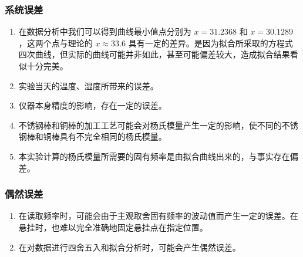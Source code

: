 \subsubsection{系统误差}
\begin{enumerate}
    \item 在数据分析中我们可以得到曲线最小值点分别为 $x=31.2368$ 和 $x=30.1289$，这两个点与理论的 $x \approx 33.6$ 具有一定的差异。是因为拟合所采取的方程式四次曲线，但实际的曲线可能并非如此，甚至可能偏差较大，造成拟合结果看似十分完美。
    \item 实验当天的温度、湿度所带来的误差。
    \item 仪器本身精度的影响，存在一定的误差。
    \item 不锈钢棒和铜棒的加工工艺可能会对杨氏模量产生一定的影响，使不同的不锈钢棒和铜棒具有不完全相同的杨氏模量。
    \item 本实验计算的杨氏模量所需要的固有频率是由拟合曲线出来的，与事实存在偏差。
\end{enumerate}
\subsubsection{偶然误差}
\begin{enumerate}
    \item 在读取频率时，可能会由于主观取舍固有频率的波动值而产生一定的误差。在悬挂时，也难以完全准确地固定悬挂点在指定位置。
    \item 在对数据进行四舍五入和拟合分析时，可能会产生偶然误差。
\end{enumerate}

